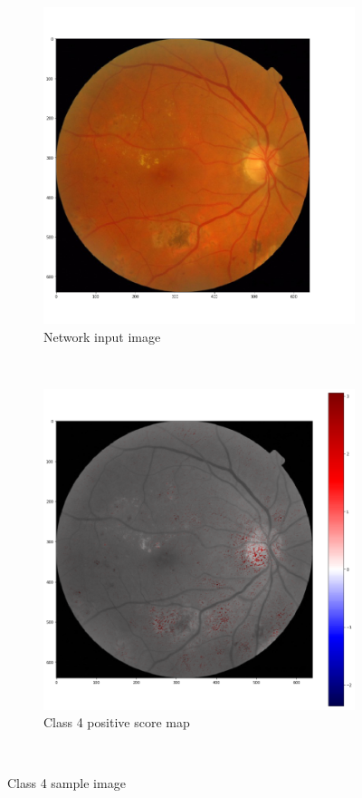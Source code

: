 \documentclass[review]{elsarticle}
\theoremstyle{definition} %
\theoremstyle{remark}
\begin{document}
\begin{figure}[ht]
	\centering
	\begin{subfigure}{0.45\textwidth}
		\includegraphics[width=\textwidth]{./figures/maps/retina.png}
		\caption{Network input image}
		\label{fig:retine_sample}
	\end{subfigure}
	~ %
	\begin{subfigure}{0.45\textwidth}
		\includegraphics[width=\textwidth]{./figures/maps/inputc.png}
		\caption{Class 4 positive score map}
		\label{fig:retine_sample_score_map}
	\end{subfigure}\\
	\caption{Class 4 sample image}	
	\label{fig:retine_test}
\end{figure}
\end{document}
